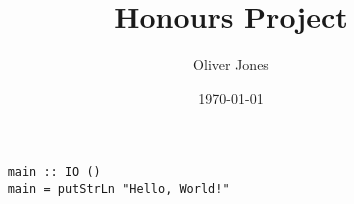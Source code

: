 \documentclass[12pt, a4paper]{article}
\title{Honours Project}
\author{Oliver Jones}
\date{\today}
\begin{document}
\maketitle



\tableofcontents

\begin{verbatim}
    main :: IO ()
    main = putStrLn "Hello, World!"
\end{verbatim}



\printbibliography
\end{document}
